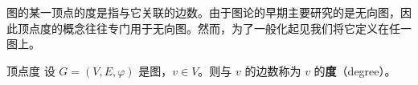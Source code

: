 

图的某一顶点的度是指与它关联的边数。由于图论的早期主要研究的是无向图，因此顶点度的概念往往专门用于无向图。然而，为了一般化起见我们将它定义在任一图上。

\begin{definition}{顶点度}
设 $G=(V,E,\varphi)$ 是图，$v\in V$。则与 $v$ 的边数称为 $v$ 的\textbf{度}（degree）。
\end{definition}





